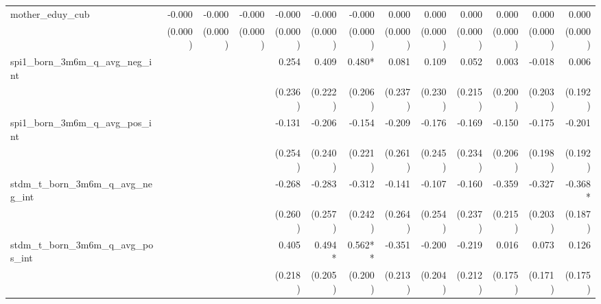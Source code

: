 \begin{tabular}{lrrrrrrrrrrrr}
mother\_eduy\_cub                           &       -0.000 &       -0.000 &       -0.000 &       -0.000 &       -0.000 &       -0.000 &        0.000 &        0.000 &        0.000 &        0.000 &        0.000 &        0.000 \\ 
                                            &      (0.000) &      (0.000) &      (0.000) &      (0.000) &      (0.000) &      (0.000) &      (0.000) &      (0.000) &      (0.000) &      (0.000) &      (0.000) &      (0.000) \\ 
spi1\_born\_3m6m\_q\_avg\_neg\_int          &              &              &              &        0.254 &        0.409 &       0.480* &        0.081 &        0.109 &        0.052 &        0.003 &       -0.018 &        0.006 \\ 
                                            &              &              &              &      (0.236) &      (0.222) &      (0.206) &      (0.237) &      (0.230) &      (0.215) &      (0.200) &      (0.203) &      (0.192) \\ 
spi1\_born\_3m6m\_q\_avg\_pos\_int          &              &              &              &       -0.131 &       -0.206 &       -0.154 &       -0.209 &       -0.176 &       -0.169 &       -0.150 &       -0.175 &       -0.201 \\ 
                                            &              &              &              &      (0.254) &      (0.240) &      (0.221) &      (0.261) &      (0.245) &      (0.234) &      (0.206) &      (0.198) &      (0.192) \\ 
stdm\_t\_born\_3m6m\_q\_avg\_neg\_int       &              &              &              &       -0.268 &       -0.283 &       -0.312 &       -0.141 &       -0.107 &       -0.160 &       -0.359 &       -0.327 &      -0.368* \\ 
                                            &              &              &              &      (0.260) &      (0.257) &      (0.242) &      (0.264) &      (0.254) &      (0.237) &      (0.215) &      (0.203) &      (0.187) \\ 
stdm\_t\_born\_3m6m\_q\_avg\_pos\_int       &              &              &              &        0.405 &       0.494* &      0.562** &       -0.351 &       -0.200 &       -0.219 &        0.016 &        0.073 &        0.126 \\ 
                                            &              &              &              &      (0.218) &      (0.205) &      (0.200) &      (0.213) &      (0.204) &      (0.212) &      (0.175) &      (0.171) &      (0.175) \\ 

\end{tabular}
